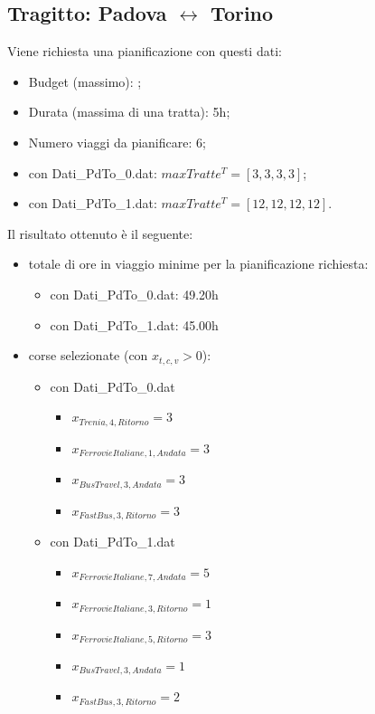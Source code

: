 \documentclass[main.tex]{subfiles}
\begin{document}
\subsection*{Tragitto: Padova $\leftrightarrow$ Torino}
Viene richiesta una pianificazione con questi dati:
\begin{itemize}
    \item Budget (massimo): ;
    \item Durata (massima di una tratta): 5h;
    \item Numero viaggi da pianificare: 6;
    \item con Dati\_PdTo\_0.dat: $maxTratte^T = [3,3,3,3]$;
    \item con Dati\_PdTo\_1.dat: $maxTratte^T = [12,12,12,12]$.
\end{itemize}
Il risultato ottenuto è il seguente:
\begin{itemize}
    \item totale di ore in viaggio minime per la pianificazione richiesta:
    \begin{itemize}
        \item con Dati\_PdTo\_0.dat: 49.20h
        \item con Dati\_PdTo\_1.dat: 45.00h
    \end{itemize}
    \item corse selezionate (con $x_{t,c,v} > 0$):
    \begin{itemize}
        \item con Dati\_PdTo\_0.dat
        \begin{itemize}
            \item $x_{Trenia,4,Ritorno} = 3$
            \item $x_{FerrovieItaliane,1,Andata} = 3$
            \item $x_{BusTravel,3,Andata} = 3$
            \item $x_{FastBus,3,Ritorno} = 3$
        \end{itemize}
        \item con Dati\_PdTo\_1.dat
        \begin{itemize}
            \item $x_{FerrovieItaliane,7,Andata} = 5$
            \item $x_{FerrovieItaliane,3,Ritorno} = 1$
            \item $x_{FerrovieItaliane,5,Ritorno} = 3$
            \item $x_{BusTravel,3,Andata} = 1$
            \item $x_{FastBus,3,Ritorno} = 2$

\end{itemize}
\end{itemize}
\end{itemize}
\end{document}
